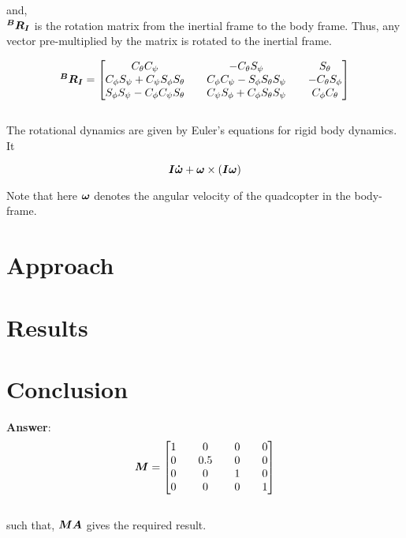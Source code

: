 \documentclass[12pt,fleqn]{article}
\newcommand{\mbm}[1]{\mbox{\boldmath $#1$}}
\begin{document}
and,\\ 

$ \mbm{^BR_I} $ is the rotation matrix from the inertial frame to the
body frame. Thus, any vector pre-multiplied by the matrix is
rotated to the inertial frame.

$$ \mbm{^BR_I} = \begin{bmatrix} C_\theta C_\psi && -C_\theta S_\psi && S_\theta\\
C_\phi S_\psi + C_\psi S_\phi S_\theta&& C_\phi C_\psi - S_\phi
S_\theta S_\psi&& -C_\theta S_\phi\\
S_\phi S_\psi - C_\phi C_\psi S_\theta&&
C_\psi S_\phi + C_\phi S_\theta S_\psi&&
C_\phi C_\theta \end{bmatrix} $$
\\

The rotational dynamics are given by Euler's equations for rigid body
dynamics. It

$$ \mbm{I\dot{\omega}} + \mbm{\omega} \times (\mbm{I\omega}) $$

Note that here $\mbm{\omega}$ denotes the angular velocity of the
quadcopter in the body-frame. 



\section{Approach}

\section{Results}

\section{Conclusion}

  \textbf{Answer}: $$ \mbm{M} = \begin{bmatrix}1&&0&&0&&0 \\
    0&&0.5&&0&&0 \\ 0&&0&&1&&0 \\ 0&&0&&0&&1 \end{bmatrix} $$ \\ such
  that, $\mbm{MA}$ gives the required result.   




\end{document}
